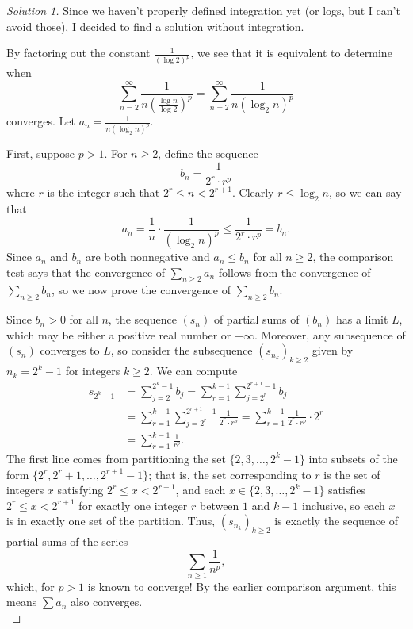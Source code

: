 \documentclass[11pt]{scrartcl}
\theoremstyle{problem}
\theoremstyle{remark}
\begin{document}
\begin{proof}[Solution 1]
	Since we haven't properly defined integration yet
	(or logs, but I can't avoid those), I decided to find a solution
	without integration.
	
	By factoring out the constant $\frac1{(\log 2)^p}$,
	we see that it is equivalent to determine when
	\[\sum_{n = 2}^\infty \frac{1}{n(\frac{\log n}{\log 2})^p}
	= \sum_{n = 2}^\infty \frac{1}{n(\log_2 n)^p}\]
	converges.
	Let $a_n = \frac{1}{n(\log_2 n)^p}$.
	
	First, suppose $p > 1$. For $n\ge 2$, define the sequence
	\[b_n = \frac{1}{2^r\cdot r^p}\]
	where $r$ is the integer such that $2^{r} \le n < 2^{r+1}$.
	Clearly $r\le \log_2 n$, so we can say that
	\[a_n = \frac 1n \cdot \frac{1}{(\log_2 n)^p} \le
	\frac{1}{2^r\cdot r^p} = b_n.\]
	Since $a_n$ and $b_n$ are both nonnegative
	and $a_n \le b_n$ for all $n\ge 2$, the comparison test says that
	the convergence of $\sum_{n\ge 2} a_n$ follows from
	the convergence of $\sum_{n\ge 2} b_n$,
	so we now prove the convergence of $\sum_{n\ge 2}b_n$.
	
	Since $b_n > 0$ for all $n$, the sequence $(s_n)$ of
	partial sums of $(b_n)$ has a limit $L$,
	which may be either a positive real number or $+\infty$.
	Moreover, any subsequence of $(s_n)$ converges to $L$,
	so consider the subsequence $(s_{n_k})_{k\ge 2}$ given by
	$n_k = 2^k - 1$ for integers $k\ge 2$.
	We can compute
	\begin{align*}
		s_{2^k - 1} &= \sum_{j=2}^{2^k-1} b_j
		= \sum_{r=1}^{k-1} \sum_{j=2^r}^{2^{r+1}-1} b_j\\
		&= \sum_{r=1}^{k-1} \sum_{j=2^r}^{2^{r+1}-1} \frac{1}{2^r\cdot r^p}
		= \sum_{r=1}^{k-1} \frac{1}{2^r\cdot r^p}\cdot 2^r\\
		&= \sum_{r=1}^{k-1} \frac{1}{ r^p}.
	\end{align*}
	The first line comes from partitioning the set
	$\{2, 3, \dots, 2^k-1\}$ into subsets of the form
	$\{2^r, 2^r + 1, \dots, 2^{r+1} - 1\}$; that is,
	the set corresponding to $r$
	is the set of integers $x$ satisfying $2^r\le x < 2^{r+1}$,
	and each $x\in\{2, 3, \dots, 2^{k} - 1\}$ satisfies
	$2^r \le x < 2^{r+1}$ for exactly one integer $r$
	between $1$ and $k - 1$ inclusive, so each $x$ is in exactly
	one set of the partition.
	Thus, $(s_{n_k})_{k\ge 2}$ is exactly the sequence of partial sums
	of the series
	\[\sum_{n\ge 1} \frac{1}{n^p},\]
	which, for $p > 1$ is known to converge!
	By the earlier comparison argument, this means
	$\sum a_n$ also converges.\\
	

\end{proof}
\end{document}

